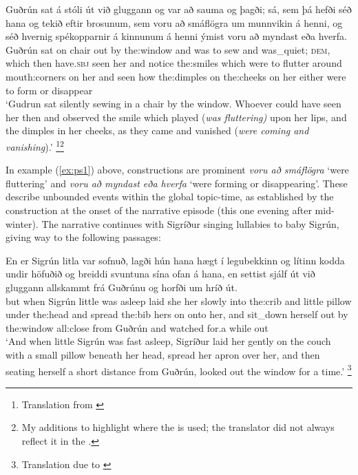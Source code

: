 \documentclass[output=paper,colorlinks,citecolor=brown]{langscibook}
\begin{document}
\ea\label{ex:ps1}
\gll Guðrún sat á stóli út við gluggann og var að sauma og þagði; sá, sem þá hefði séð hana og tekið eftir brosunum, sem voru að smáflögra um munnvikin á henni, og séð hvernig spékopparnir á kinnunum á henni ýmist voru að myndast eða hverfa.\\ Guðrún sat on chair out by the:window and was to sew and was\_quiet; \textsc{dem}, which then have.\textsc{sbj} seen her and notice {} the:smiles which were to flutter around mouth:corners on her and seen how the:dimples on the:cheeks on her either were to form or disappear\\
\glt `Gudrun sat silently sewing in a chair by the window. Whoever could have seen her then and observed the smile which played (\textit{was fluttering)} upon her lips, and the dimples in her cheeks, as they came and vanished (\textit{were coming and vanishing}).' \hfill \citep{Thoroddsen_PilturOgStulka}\footnote{Translation from \citep[164]{thoroddsen1890lad}}\footnote{My additions to highlight where the  is used; the translator did not always reflect it in the .}
\z

In example (\ref{ex:ps1}) above,   constructions are prominent \textit{voru að smáflögra} `were fluttering' and \textit{voru að myndast eða hverfa} `were forming or disappearing'. These describe unbounded events within the global topic-time, as established by the  construction at the onset of the narrative episode (this one evening after mid-winter). The narrative continues with Sigríður singing lullabies to baby Sigrún, giving way to the following passages:

\ea\label{ex:ps2}
\gll En er Sigrún litla var sofnuð, lagði hún hana hægt í legubekkinn og lítinn kodda undir höfuðið og breiddi svuntuna sína ofan á hana, en settist sjálf út við gluggann allskammt frá Guðrúnu og horfði um hríð út. \\
but when Sigrún little was asleep laid she her slowly into the:crib and little pillow under the:head and spread the:bib hers on onto her, and sit\_down herself out by the:window all:close from Guðrún and watched for.a while out\\
\glt `And when little Sigrún was fast asleep, Sigríður laid her gently on the couch with a small pillow beneath her head, spread her apron over her, and then seating herself a short distance from Guðrún, looked out the window for a time.' \hfill \citet{Thoroddsen_PilturOgStulka}\footnote{Translation due to \citet[166]{thoroddsen1890lad}}
\z
\end{document}
